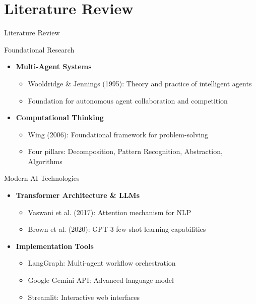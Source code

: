 \documentclass[aspectratio=169]{beamer}
\begin{document}
\section{Literature Review}
\begin{frame}{Literature Review}
    \begin{block}{Foundational Research}
        \begin{itemize}
            \footnotesize
            \item \textbf{Multi-Agent Systems} \cite{wooldridge1995}
            \begin{itemize}
                \scriptsize
                \item Wooldridge \& Jennings (1995): Theory and practice of intelligent agents
                \item Foundation for autonomous agent collaboration and competition
            \end{itemize}
            
            \item \textbf{Computational Thinking} \cite{wing2006}
            \begin{itemize}
                \scriptsize
                \item Wing (2006): Foundational framework for problem-solving
                \item Four pillars: Decomposition, Pattern Recognition, Abstraction, Algorithms
            \end{itemize}
        \end{itemize}
    \end{block}
    
    \begin{block}{Modern AI Technologies}
        \begin{itemize}
            \footnotesize
            \item \textbf{Transformer Architecture \& LLMs} \cite{vaswani2017, brown2020}
            \begin{itemize}
                \scriptsize
                \item Vaswani et al. (2017): Attention mechanism for NLP
                \item Brown et al. (2020): GPT-3 few-shot learning capabilities
            \end{itemize}
            
            \item \textbf{Implementation Tools} \cite{langgraph2024, gemini2024, streamlit2024}
            \begin{itemize}
                \scriptsize
                \item LangGraph: Multi-agent workflow orchestration
                \item Google Gemini API: Advanced language model
                \item Streamlit: Interactive web interfaces
            \end{itemize}
        \end{itemize}
    \end{block}
\end{frame}
\end{document}
